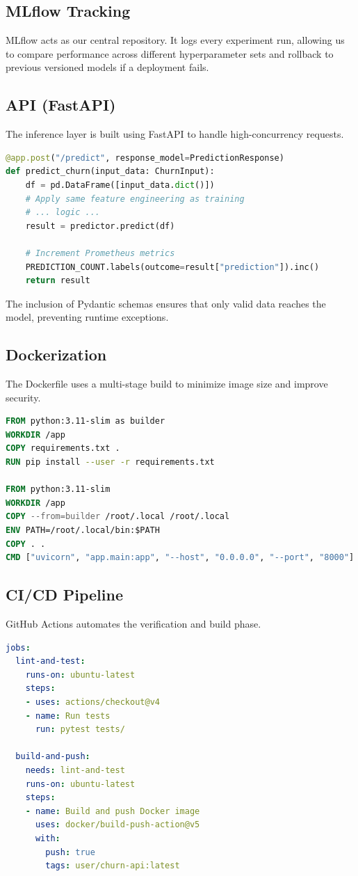 \documentclass[12pt,a4paper]{article}
\begin{document}
\subsection{MLflow Tracking}
MLflow acts as our central repository. It logs every experiment run, allowing us to compare performance across different hyperparameter sets and rollback to previous versioned models if a deployment fails.

\subsection{API (FastAPI)}
The inference layer is built using FastAPI to handle high-concurrency requests.
\begin{lstlisting}[language=Python, caption=app/main.py]
@app.post("/predict", response_model=PredictionResponse)
def predict_churn(input_data: ChurnInput):
    df = pd.DataFrame([input_data.dict()])
    # Apply same feature engineering as training
    # ... logic ...
    result = predictor.predict(df)
    
    # Increment Prometheus metrics
    PREDICTION_COUNT.labels(outcome=result["prediction"]).inc()
    return result
\end{lstlisting}
The inclusion of Pydantic schemas ensures that only valid data reaches the model, preventing runtime exceptions.

\subsection{Dockerization}
The Dockerfile uses a multi-stage build to minimize image size and improve security.
\begin{lstlisting}[language=Dockerfile, caption=Dockerfile]
FROM python:3.11-slim as builder
WORKDIR /app
COPY requirements.txt .
RUN pip install --user -r requirements.txt

FROM python:3.11-slim
WORKDIR /app
COPY --from=builder /root/.local /root/.local
ENV PATH=/root/.local/bin:$PATH
COPY . .
CMD ["uvicorn", "app.main:app", "--host", "0.0.0.0", "--port", "8000"]
\end{lstlisting}

\subsection{CI/CD Pipeline}
GitHub Actions automates the verification and build phase.
\begin{lstlisting}[language=Yaml, caption=.github/workflows/ci-cd.yaml]
jobs:
  lint-and-test:
    runs-on: ubuntu-latest
    steps:
    - uses: actions/checkout@v4
    - name: Run tests
      run: pytest tests/
      
  build-and-push:
    needs: lint-and-test
    runs-on: ubuntu-latest
    steps:
    - name: Build and push Docker image
      uses: docker/build-push-action@v5
      with:
        push: true
        tags: user/churn-api:latest
\end{lstlisting}
\end{document}
